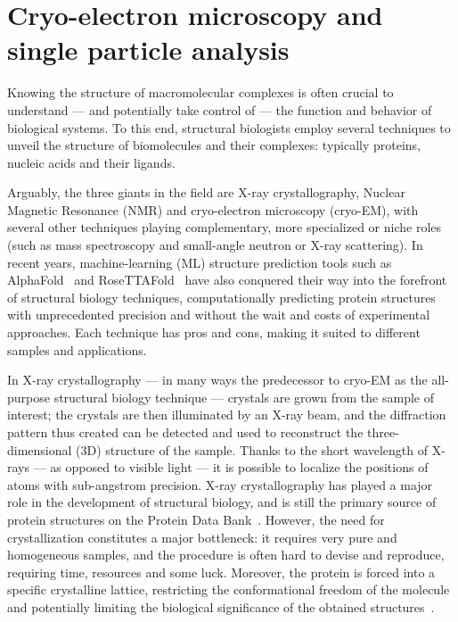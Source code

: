 \chapter[Cryo-EM and SPA]{Cryo-electron microscopy and single particle analysis}\label{em}

Knowing the structure of macromolecular complexes is often crucial to understand --- and potentially take control of --- the function and behavior of biological systems.
To this end, structural biologists employ several techniques to unveil the structure of biomolecules and their complexes: typically proteins, nucleic acids and their ligands.

Arguably, the three giants in the field are X-ray crystallography, Nuclear Magnetic Resonance (NMR) and cryo-electron microscopy (cryo-EM), with several other techniques playing complementary, more specialized or niche roles (such as mass spectroscopy and small-angle neutron or X-ray scattering).
In recent years, machine-learning (ML) structure prediction tools such as AlphaFold~\cite{jumperHighlyAccurateProtein2021,abramsonAccurateStructurePrediction2024} and RoseTTAFold~\cite{baekAccuratePredictionProtein2021} have also conquered their way into the forefront of structural biology techniques, computationally predicting protein structures with unprecedented precision and without the wait and costs of experimental approaches.
Each technique has pros and cons, making it suited to different samples and applications.

In X-ray crystallography --- in many ways the predecessor to cryo-EM as the all-purpose structural biology technique --- crystals are grown from the sample of interest; the crystals are then illuminated by an X-ray beam, and the diffraction pattern thus created can be detected and used to reconstruct the three-dimensional (3D) structure of the sample.
Thanks to the short wavelength of X-rays --- as opposed to visible light --- it is possible to localize the positions of atoms with sub-angstrom precision.
X-ray crystallography has played a major role in the development of structural biology, and is still the primary source of protein structures on the Protein Data Bank~\cite{bermanProteinDataBank2000,bermanAnnouncingWorldwideProtein2003}.
However, the need for crystallization constitutes a major bottleneck: it requires very pure and homogeneous samples, and the procedure is often hard to devise and reproduce, requiring time, resources and some luck.
Moreover, the protein is forced into a specific crystalline lattice, restricting the conformational freedom of the molecule and potentially limiting the biological significance of the obtained structures~\cite{ravikumarComparisonSidechainDispersion2022}.


